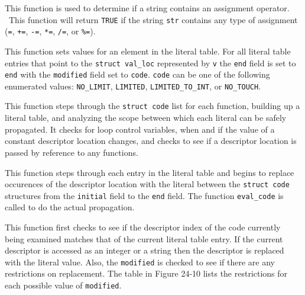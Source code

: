 
This function is used to determine if a string contains an assignment
operator. \ This function will return \texttt{TRUE} if the string
\texttt{str} contains any type of assignment (\texttt{=}, \texttt{+=},
\texttt{{}-=}, \texttt{*=}, \texttt{/=}, or \texttt{\%=}).



This function sets values for an element in the literal table. For all
literal table entries that point to the \texttt{struct val\_loc}
represented by \texttt{v} the \texttt{end} field is set to
\texttt{end} with the \texttt{modified} field set to
\texttt{code}. \texttt{code} can be one of the following enumerated
values: \texttt{NO\_LIMIT}, \texttt{LIMITED},
\texttt{LIMITED\_TO\_INT}, or \texttt{NO\_TOUCH}.



This function steps through the \texttt{struct code} list for each
function, building up a literal table, and analyzing the scope between
which each literal can be safely propagated. It checks for loop
control variables, when and if the value of a constant descriptor
location changes, and checks to see if a descriptor location is passed
by reference to any functions.


This function steps through each entry in the literal table and begins
to replace occurences of the descriptor location with the literal
between the \texttt{struct code} structures from the \texttt{initial}
field to the \texttt{end} field.  The function \texttt{eval\_code} is
called to do the actual propagation.


This function first checks to see if the descriptor index of the code
currently being examined matches that of the current literal table
entry. If the current descriptor is accessed as an integer or a string
then the descriptor is replaced with the literal value. Also, the
\texttt{modified} is checked to see if there are any restrictions on
replacement. The table in Figure 24-10 lists the restrictions for
each possible value of \texttt{modified}.

